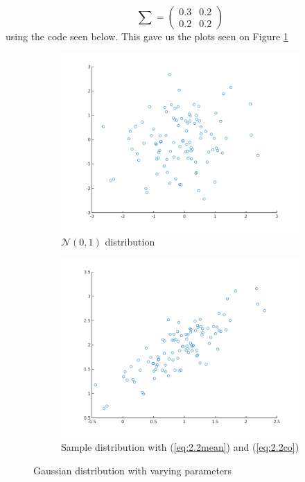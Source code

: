 \documentclass{article}
\begin{document}
\begin{equation}\label{eq:2.2co}
    \sum = \left( \begin{array}{cc} 0.3 & 0.2 \\ 0.2 & 0.2 \end{array} \right)
\end{equation}
using the code seen below. This gave us the plots seen on Figure \ref{fig:I2.2}
\begin{figure}[!ht]
    \centering
    \begin{subfigure}[b]{0.5\textwidth}
        \includegraphics[width=\textwidth]{part1/I221.png}
        \caption{$\mathscr{N}(0,1)$ distribution}
    \end{subfigure}%
    \begin{subfigure}[b]{0.5\textwidth}
        \includegraphics[width=\textwidth]{part1/I222.png}
        \caption{Sample distribution with (\ref{eq:2.2mean}) and (\ref{eq:2.2co})}
    \end{subfigure}
    \caption{Gaussian distribution with varying parameters}
    \label{fig:I2.2}
\end{figure}
\end{document}
